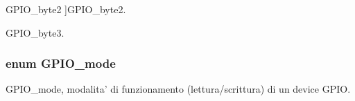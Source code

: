 \begin{Desc}
\begin{description}
{\hypertarget{group___g_p_i_o___g_r_o_u_p_gga6d5aef8a8a54ee2f602d47252ff66595acf385bd78e3d36725f9d82955fce5fcf}{G\+P\+I\+O\+\_\+byte2}\label{group___g_p_i_o___g_r_o_u_p_gga6d5aef8a8a54ee2f602d47252ff66595acf385bd78e3d36725f9d82955fce5fcf}
}]G\+P\+I\+O\+\_\+byte2. \item[{\em 
\hypertarget{group___g_p_i_o___g_r_o_u_p_gga6d5aef8a8a54ee2f602d47252ff66595adf78991a114e960df39d947c450de88c}{G\+P\+I\+O\+\_\+byte3}\label{group___g_p_i_o___g_r_o_u_p_gga6d5aef8a8a54ee2f602d47252ff66595adf78991a114e960df39d947c450de88c}
}]G\+P\+I\+O\+\_\+byte3. \end{description}
\end{Desc}
\hypertarget{group___g_p_i_o___g_r_o_u_p_ga894e6ae857ed4a9aedd04fff44a6770e}{
\subsubsection[{G\+P\+I\+O\+\_\+mode}]{\setlength{\rightskip}{0pt plus 5cm}enum {\bf G\+P\+I\+O\+\_\+mode}}}\label{group___g_p_i_o___g_r_o_u_p_ga894e6ae857ed4a9aedd04fff44a6770e}


G\+P\+I\+O\+\_\+mode, modalita' di funzionamento (lettura/scrittura) di un device G\+P\+I\+O. 

